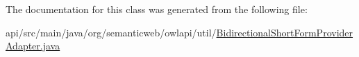 The documentation for this class was generated from the following file\-:\begin{DoxyCompactItemize}
\item 
api/src/main/java/org/semanticweb/owlapi/util/\hyperlink{_bidirectional_short_form_provider_adapter_8java}{Bidirectional\-Short\-Form\-Provider\-Adapter.\-java}\end{DoxyCompactItemize}
